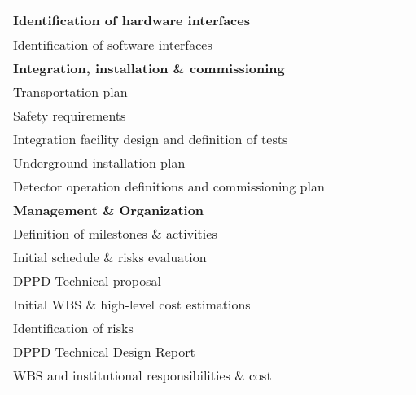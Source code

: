 \begin{table}[htpb]
\begin{center}
\begin{tabular}{|l|c|c|c|c|c|c|}
Identification of hardware interfaces &  \cellcolor{gray} & & & & & \\ \hline
Identification of software interfaces & &  \cellcolor{gray} & & & & \\ \hline
\multicolumn{7}{|l|}{\bf Integration, installation \& commissioning} \\ \hline
Transportation plan & &  \cellcolor{gray} & & & & \\ \hline
Safety requirements & & &  \cellcolor{gray} & & & \\ \hline
Integration facility design and definition of tests & & &  \cellcolor{gray} & & & \\ \hline
Underground installation plan & & & &  \cellcolor{gray} & & \\ \hline
Detector operation definitions and commissioning plan  & & & &  \cellcolor{gray} & & \\ \hline
\multicolumn{7}{|l|}{\bf Management \& Organization} \\ \hline
Definition of milestones \& activities &  \cellcolor{gray} & & & & & \\ \hline
Initial schedule \& risks evaluation & &  \cellcolor{gray} & & & & \\ \hline
DPPD Technical proposal & &  \cellcolor{gray} & & & & \\ \hline
Initial WBS \& high-level cost estimations & &  \cellcolor{gray} & & & & \\ \hline
Identification of risks & & & & &  \cellcolor{gray} & \\ \hline
DPPD Technical Design Report & & & & & &  \cellcolor{gray} \\ \hline
WBS and institutional responsibilities \& cost & & & & & &  \cellcolor{gray} \\ \hline
\end{tabular}
\label{tab:schedule}
\end{center}
\end{table}

